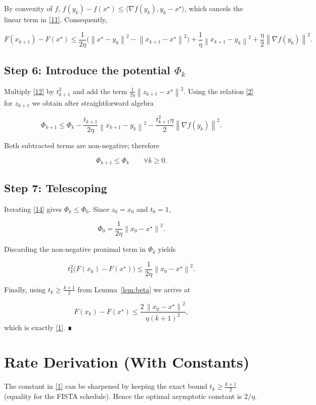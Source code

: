 \documentclass{article}
\newcommand{\norm}[1]{\left\lVert#1\right\rVert}
\begin{document}
By convexity of $f$, $f(y_k)-f(x^{\star})\le\langle\nabla f(y_k),y_k-x^{\star}\rangle$,
which cancels the linear term in \eqref{11}. Consequently,

\[
F(x_{k+1})-F(x^{\star})
\le \frac{1}{2\eta}\bigl(\norm{x^{\star}-y_k}^{2}
      -\norm{x_{k+1}-x^{\star}}^{2}\bigr)
   +\frac{1}{\eta}\norm{x_{k+1}-y_k}^{2}
   +\frac{\eta}{2}\norm{\nabla f(y_k)}^{2}.
\tag{12}
\]

\subsection*{Step 6: Introduce the potential $\Phi_k$}
Multiply \eqref{12} by $t_{k+1}^{2}$ and add the term
$\frac{1}{2\eta}\norm{z_{k+1}-x^{\star}}^{2}$.
Using the relation \eqref{2} for $z_{k+1}$ we obtain after straightforward algebra

\[
\Phi_{k+1}
\le \Phi_k
   -\frac{t_{k+1}}{2\eta}\norm{x_{k+1}-y_k}^{2}
   -\frac{t_{k+1}^{2}\eta}{2}\norm{\nabla f(y_k)}^{2}.
\tag{13}
\]

Both subtracted terms are non‑negative; therefore

\[
\Phi_{k+1}\le\Phi_k\qquad\forall k\ge0.
\tag{14}
\]

\subsection*{Step 7: Telescoping}
Iterating \eqref{14} gives $\Phi_{k}\le\Phi_{0}$.
Since $z_0 = x_0$ and $t_0=1$,  

\[
\Phi_0 = \frac{1}{2\eta}\norm{x_0-x^{\star}}^{2}.
\tag{15}
\]

Discarding the non‑negative proximal term in $\Phi_k$ yields

\[
t_k^{2}\bigl(F(x_k)-F(x^{\star})\bigr)
\le \frac{1}{2\eta}\norm{x_0-x^{\star}}^{2}.
\tag{16}
\]

Finally, using $t_k\ge\frac{k+1}{2}$ from Lemma~\ref{lem:beta} we arrive at

\[
F(x_k)-F(x^{\star})\le
\frac{2\,\norm{x_0-x^{\star}}^{2}}{\eta (k+1)^{2}},
\]
which is exactly \eqref{1}. ∎

\section*{Rate Derivation (With Constants)}
The constant in \eqref{1} can be sharpened by keeping the exact bound
$t_k\ge \frac{k+1}{2}$ (equality for the FISTA schedule). Hence the optimal
asymptotic constant is $2/\eta$.
\end{document}
